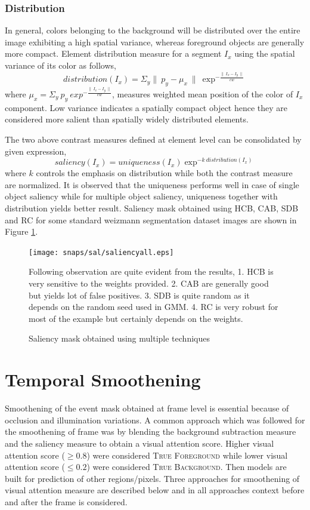 \subsubsection{Distribution}
In general, colors belonging to the background will be distributed over the entire image exhibiting a high spatial variance, whereas foreground objects are generally more compact. Element distribution measure for a segment $I_{x}$ using the spatial variance of its color as follows,
$$distribution(I_{x}) = \Sigma_{y} \parallel~p_{y} -\mu_{x}~\parallel~\exp^{-\frac{\parallel~I_{x} - I_{y}~\parallel}{cw}}$$ 
where $\mu_{x} = \Sigma_{y}~p_{y}~exp^{-\frac{\parallel~I_{x} - I_{y}~\parallel}{cw}}$, measures weighted mean position of the color of $I_{x}$ component. Low variance indicates a spatially compact object hence they are considered more salient than spatially widely distributed elements.

\par The two above contrast measures defined at element level can be consolidated by given expression,
$$saliency(I_{x}) = uniqueness(I_{x}) \exp^{-k~distribution(I_{x})}$$
where $k$ controls the emphasis on distribution while both the contrast measure are normalized. It is observed that the uniqueness performs well in case of single object saliency while for multiple object saliency, uniqueness together with distribution yields better result. Saliency mask obtained using HCB, CAB, SDB and RC for some standard weizmann segmentation dataset images are shown in Figure \ref{fig:sal}. 

\begin{figure}[htpb]
   \begin{center}
	    \texttt{[image: snaps/sal/saliencyall.eps]}     
     \caption {Saliency mask obtained using multiple techniques}
     \medskip \small 
     Following observation are quite evident from the results, 1. HCB is very sensitive to the weights provided. 2. CAB are generally good but yields lot of false positives. 3. SDB is quite random as it depends on the random seed used in GMM. 4. RC is very robust for most of the example but certainly depends on the weights.
   \label{fig:sal}
   \end{center}
 \end{figure}

 \section{Temporal Smoothening}
  \label{sec:ts}
Smoothening of the event mask obtained at frame level is essential because of occlusion and illumination variations. A common approach which was followed for the smoothening of frame was by blending the background subtraction measure and the saliency measure to obtain a visual attention score. Higher visual attention score ($\geqslant0.8$) were considered \textsc{True Foreground} while lower visual attention score ($\leqslant0.2$)  were considered \textsc{True Background}.  Then models are built for prediction of other regions/pixels.  Three approaches for smoothening of visual attention measure are described below and in all approaches context before and after the frame is considered.

